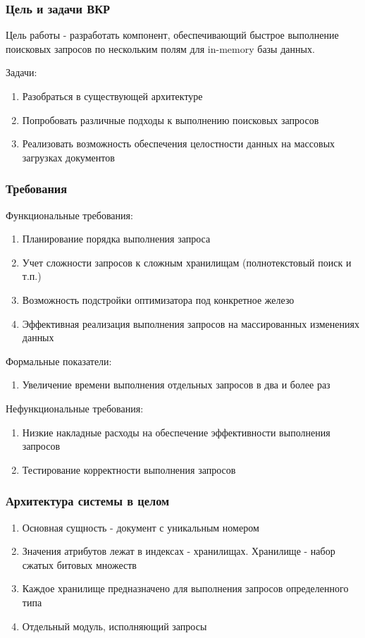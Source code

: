 \documentclass{beamer}
\begin{document}
\begin{frame}\frametitle{Цель и задачи ВКР}
    Цель работы - разработать компонент, обеспечивающий быстрое выполнение поисковых запросов по нескольким полям для in-memory базы данных.
    
    Задачи:
    \begin{enumerate}
        \item Разобраться в существующей архитектуре
        \item Попробовать различные подходы к выполнению поисковых запросов
        \item Реализовать возможность обеспечения целостности данных на массовых загрузках документов
    \end{enumerate}
\end{frame}

\begin{frame}\frametitle{Требования}
    Функциональные требования:
        \begin{enumerate}\itemsep0pt \parskip0pt 
            \item Планирование порядка выполнения запроса
            \item Учет сложности запросов к сложным хранилищам (полнотекстовый поиск и т.п.)
            \item Возможность подстройки оптимизатора под конкретное железо
            \item Эффективная реализация выполнения запросов на массированных изменениях данных
        \end{enumerate}
    Формальные показатели:
        \begin{enumerate}\itemsep0pt \parskip0pt  
            \item Увеличение времени выполнения отдельных запросов в два и более раз
        \end{enumerate}
    Нефункциональные требования:
        \begin{enumerate}\itemsep0pt \parskip0pt  
                \item Низкие накладные расходы на обеспечение эффективности выполнения запросов
                \item Тестирование корректности выполнения запросов
        \end{enumerate}
\end{frame}


\begin{frame}\frametitle{Архитектура системы в целом}
    \begin{enumerate}
        \item Основная сущность - документ с уникальным номером
        \item Значения атрибутов лежат в индексах - хранилищах. Хранилище - набор сжатых битовых множеств
        \item Каждое хранилище предназначено для выполнения запросов определенного типа
        \item Отдельный модуль, исполняющий запросы
    \end{enumerate}
\end{frame}
\end{document}
